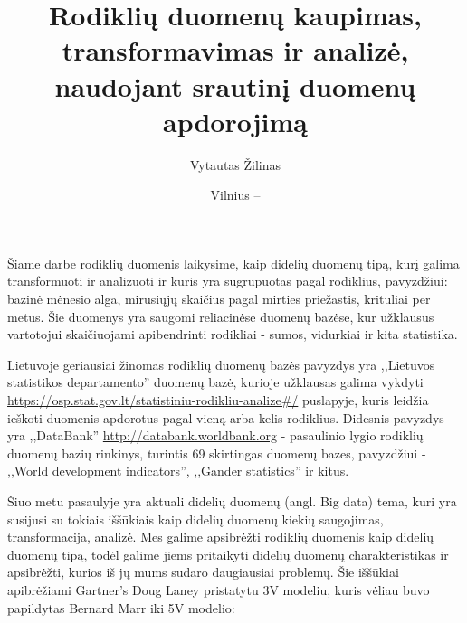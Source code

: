 \documentclass{VUMIFPSkursinis}
\title{Rodiklių duomenų kaupimas, transformavimas ir analizė, naudojant srautinį duomenų apdorojimą}
\author{Vytautas Žilinas}
\date{Vilnius – \the\year}
\begin{document}
	
\maketitle
\cleardoublepage{}
\setcounter{page}{2}

\tableofcontents


    Šiame darbe rodiklių duomenis laikysime, kaip didelių duomenų tipą, kurį galima transformuoti ir analizuoti ir kuris yra sugrupuotas pagal rodiklius, 
pavyzdžiui: bazinė mėnesio alga, mirusiųjų skaičius pagal mirties priežastis, krituliai per metus. Šie duomenys yra saugomi reliacinėse duomenų bazėse, 
kur užklausus vartotojui skaičiuojami apibendrinti rodikliai - sumos, vidurkiai ir kita statistika.\par
Lietuvoje geriausiai žinomas rodiklių duomenų bazės pavyzdys yra ,,Lietuvos statistikos departamento'' duomenų bazė, kurioje užklausas galima vykdyti
\url{https://osp.stat.gov.lt/statistiniu-rodikliu-analize#/} puslapyje, kuris leidžia ieškoti duomenis apdorotus pagal vieną arba kelis rodiklius. 
Didesnis pavyzdys yra ,,DataBank'' \url{http://databank.worldbank.org} - pasaulinio lygio rodiklių duomenų bazių rinkinys, turintis 69 skirtingas 
duomenų bazes, pavyzdžiui - ,,World development indicators'', ,,Gander statistics'' ir kitus\cite{databank-stats}. \par
Šiuo metu pasaulyje yra aktuali didelių duomenų (angl. Big data) tema, kuri yra susijusi su tokiais iššūkiais kaip didelių duomenų kiekių saugojimas, 
transformacija, analizė. Mes galime apsibrėžti rodiklių duomenis kaip didelių duomenų tipą, todėl galime jiems pritaikyti didelių duomenų charakteristikas 
ir apsibrėžti, kurios iš jų mums sudaro daugiausiai problemų. Šie iššūkiai apibrėžiami Gartner's Doug Laney pristatytu 3V modeliu\cite{laney20013d},
kuris vėliau buvo papildytas Bernard Marr iki 5V modelio\cite{marr2014big}:
\end{document}
